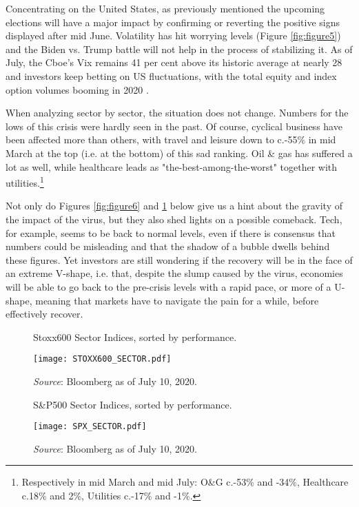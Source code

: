 \documentclass[12pt]{article}
\begin{document}
Concentrating on the United States, as previously mentioned the upcoming elections will have a major impact by confirming or reverting the positive signs displayed after mid June. Volatility has hit worrying levels (Figure \ref{fig:figure5}) and the Biden vs. Trump battle will not help in the process of stabilizing it. As of July, the Cboe's Vix remains 41 per cent above its historic average at nearly 28 and investors keep betting on US fluctuations, with the total equity and index option volumes booming in 2020 \cite{us_vol}.

When analyzing sector by sector, the situation does not change. Numbers for the lows of this crisis were hardly seen in the past. Of course, cyclical business have been affected more than others, with travel and leisure down to c.-55\% in mid March at the top (i.e. at the bottom) of this sad ranking. Oil \& gas has suffered a lot as well, while healthcare leads as "the-best-among-the-worst" together with utilities.\footnote{Respectively in mid March and mid July: O\&G c.-53\% and -34\%, Healthcare c.18\% and 2\%, Utilities c.-17\% and -1\%.}

Not only do Figures \ref{fig:figure6} and \ref{fig:figure7} below give us a hint about the gravity of the impact of the virus, but they also shed lights on a possible comeback. Tech, for example, seems to be back to normal levels, even if there is consensus that numbers could be misleading and that the shadow of a bubble dwells behind these figures. Yet investors are still wondering if the recovery will be in the face of an extreme V-shape, i.e. that, despite the slump caused by the virus, economies will be able to go back to the pre-crisis levels with a rapid pace, or more of a U-shape, meaning that markets have to navigate the pain for a while, before effectively recover. \\

\begin{figure}[H]
\centering
\begin{minipage}[b]{.45\textwidth}
\centering
\caption{Stoxx600 Sector Indices, sorted by performance.}
\texttt{[image: STOXX600\_SECTOR.pdf]}
\caption*{\textit{Source}: Bloomberg as of July 10, 2020.}
\label{fig:figure6}
\end{minipage}%
\hfill
\begin{minipage}[b]{.45\textwidth}
\centering
\caption{S\&P500 Sector Indices, sorted by performance.}
\texttt{[image: SPX\_SECTOR.pdf]}
\caption*{\textit{Source}: Bloomberg as of July 10, 2020.}
\label{fig:figure7}
\end{minipage}
\end{figure}
\end{document}
